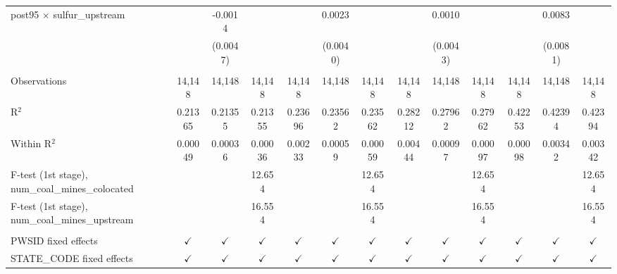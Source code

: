 \begin{table}[htbp]
\begin{adjustbox}{width = \textwidth, center}
\begin{tabular}{lcccccccccccc}
         post95 $\times$ sulfur\_upstream                   &                        & -0.0014       &               &                        & 0.0023        &               &                 & 0.0010         &               &               & 0.0083        &   \\   
                                                            &                        & (0.0047)      &               &                        & (0.0040)      &               &                 & (0.0043)       &               &               & (0.0081)      &   \\   
          \\
         Observations                                       & 14,148                 & 14,148        & 14,148        & 14,148                 & 14,148        & 14,148        & 14,148          & 14,148         & 14,148        & 14,148        & 14,148        & 14,148\\  
         R$^2$                                              & 0.21365                & 0.21355       & 0.21355       & 0.23696                & 0.23562       & 0.23562       & 0.28212         & 0.27962        & 0.27962       & 0.42253       & 0.42394       & 0.42394\\  
         Within R$^2$                                       & 0.00049                & 0.00036       & 0.00036       & 0.00233                & 0.00059       & 0.00059       & 0.00444         & 0.00097        & 0.00097       & 0.00098       & 0.00342       & 0.00342\\  
         F-test (1st stage), num\_coal\_mines\_colocated    &                        &               & 12.654        &                        &               & 12.654        &                 &                & 12.654        &               &               & 12.654\\  
         F-test (1st stage), num\_coal\_mines\_upstream     &                        &               & 16.554        &                        &               & 16.554        &                 &                & 16.554        &               &               & 16.554\\  
          \\
         PWSID fixed effects                                & $\checkmark$           & $\checkmark$  & $\checkmark$  & $\checkmark$           & $\checkmark$  & $\checkmark$  & $\checkmark$    & $\checkmark$   & $\checkmark$  & $\checkmark$  & $\checkmark$  & $\checkmark$\\   
         STATE\_CODE fixed effects                          & $\checkmark$           & $\checkmark$  & $\checkmark$  & $\checkmark$           & $\checkmark$  & $\checkmark$  & $\checkmark$    & $\checkmark$   & $\checkmark$  & $\checkmark$  & $\checkmark$  & $\checkmark$\\   

\end{tabular}
\end{adjustbox}
\end{table}
